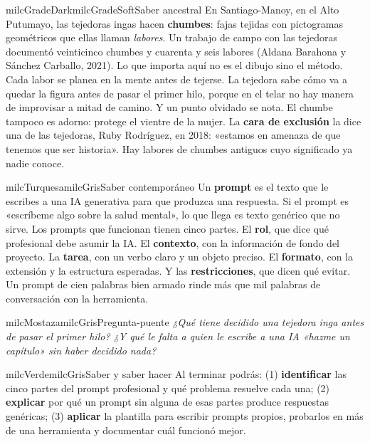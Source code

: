 \documentclass[11pt,letterpaper]{article}
\begin{document}
\begin{softbox}{milcGradeDark}{milcGradeSoft}{Saber ancestral}
En Santiago-Manoy, en el Alto Putumayo, las tejedoras ingas hacen \textbf{chumbes}: fajas tejidas con pictogramas geométricos que ellas llaman \emph{labores}. Un trabajo de campo con las tejedoras documentó veinticinco chumbes y cuarenta y seis labores (Aldana Barahona y Sánchez Carballo, 2021). Lo que importa aquí no es el dibujo sino el método. Cada labor se planea en la mente antes de tejerse. La tejedora sabe cómo va a quedar la figura antes de pasar el primer hilo, porque en el telar no hay manera de improvisar a mitad de camino. Y un punto olvidado se nota. El chumbe tampoco es adorno: protege el vientre de la mujer. La \textbf{cara de exclusión} la dice una de las tejedoras, Ruby Rodríguez, en 2018: «estamos en amenaza de que tenemos que ser historia». Hay labores de chumbes antiguos cuyo significado ya nadie conoce.\par{}
\end{softbox}

\begin{softbox}{milcTurquesa}{milcGris}{Saber contemporáneo}
Un \textbf{prompt} es el texto que le escribes a una IA generativa para que produzca una respuesta. Si el prompt es «escríbeme algo sobre la salud mental», lo que llega es texto genérico que no sirve. Los prompts que funcionan tienen cinco partes. El \textbf{rol}, que dice qué profesional debe asumir la IA. El \textbf{contexto}, con la información de fondo del proyecto. La \textbf{tarea}, con un verbo claro y un objeto preciso. El \textbf{formato}, con la extensión y la estructura esperadas. Y las \textbf{restricciones}, que dicen qué evitar. Un prompt de cien palabras bien armado rinde más que mil palabras de conversación con la herramienta.
\end{softbox}

\begin{softbox}{milcMostaza}{milcGris}{Pregunta-puente}
\textit{¿Qué tiene decidido una tejedora inga antes de pasar el primer hilo? ¿Y qué le falta a quien le escribe a una IA «hazme un capítulo» sin haber decidido nada?}
\end{softbox}

\begin{softbox}{milcVerde}{milcGris}{Saber y saber hacer}
Al terminar podrás: (1) \textbf{identificar} las cinco partes del prompt profesional y qué problema resuelve cada una; (2) \textbf{explicar} por qué un prompt sin alguna de esas partes produce respuestas genéricas; (3) \textbf{aplicar} la plantilla para escribir prompts propios, probarlos en más de una herramienta y documentar cuál funcionó mejor.
\end{softbox}
\end{document}
